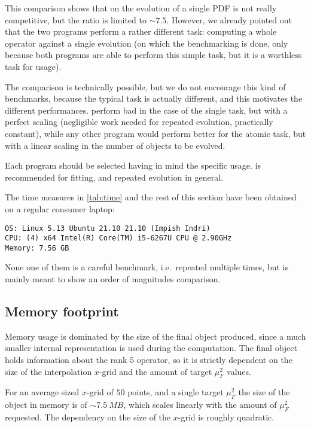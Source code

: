 This comparison shows that on the evolution of a single PDF \eko{} is not
really competitive, but the ratio is limited to $\sim 7.5$. 
However, we already pointed out that the two programs perform a rather
different task: computing a whole operator against a single \pdf{} evolution
(on which the benchmarking is done, only because both programs are able to
perform this simple task, but it is a worthless task for \eko{} usage).

The comparison is technically possible, but we do not encourage this kind of
benchmarks, because the typical task is actually different, and this motivates
the different performances.
\eko{} perform bad in the case of the single task, but with a perfect scaling
(negligible work needed for repeated evolution, practically constant), while
any other program would perform better for the atomic task, but with a linear
scaling in the number of objects to be evolved.

Each program should be selected having in mind the specific usage. \eko{} is
recommended for \pdf{} fitting, and repeated evolution in general.

The time measures in \cref{tab:time} and the rest of this
section have been obtained on a regular consumer laptop:
\begin{verbatim}
OS: Linux 5.13 Ubuntu 21.10 21.10 (Impish Indri)
CPU: (4) x64 Intel(R) Core(TM) i5-6267U CPU @ 2.90GHz
Memory: 7.56 GB
\end{verbatim}
None one of them is a careful benchmark, i.e.\ repeated multiple times, but is mainly
meant to show an order of magnitudes comparison.

\subsection{Memory footprint}
\label{app:code:memory}

Memory usage is dominated by the size of the final object produced,
since a much smaller internal representation is used during the computation.
The final object holds information about the rank $5$ operator, so it is
strictly dependent on the size of the interpolation $x$-grid and the amount of
target $\mu_F^2$ values.

For an average sized $x$-grid of $50$ points, and a single target $\mu_F^2$ the
size of the object in memory is of $\sim \SI{7.5}{MB}$, which scales linearly
with the amount of $\mu_F^2$ requested.
The dependency on the size of the $x$-grid is roughly quadratic.

